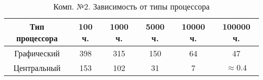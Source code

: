 \begin{table}[H]
  \caption{\label{tab:snd:cpu}Комп. №2. Зависимость от типы процессора}
  \begin{center}
    \begin{tabular}{|c|c|c|c|c|c|}
      \hline
      Тип процессора & 100 ч. & 1000 ч. & 5000 ч. & 10000 ч. & 100000 ч. \\
      \hline
      Графический & 398 & 315 & 150 & 64 & 47 \\
      Центральный & 153 & 102 & 31 & 7 & $\approx{}0.4$ \\
      \hline
    \end{tabular}
  \end{center}
\end{table}


